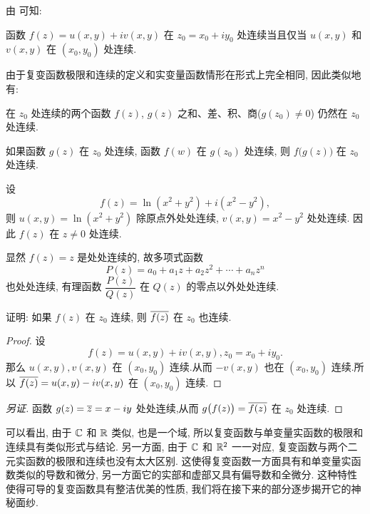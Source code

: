 由 可知:
\begin{theorem}
  函数 $f(z)=u(x,y)+iv(x,y)$ 在 $z_0=x_0+iy_0$ 处连续当且仅当 $u(x,y)$ 和 $v(x,y)$ 在 $(x_0,y_0)$ 处连续.
\end{theorem}

由于复变函数极限和连续的定义和实变量函数情形在形式上完全相同, 因此类似地有:
\begin{theorem}
  \begin{enumpar}
    \item 在 $z_0$ 处连续的两个函数 $f(z)$, $g(z)$ 之和、差、积、商($g(z_0)\neq 0$) 仍然在 $z_0$ 处连续.
    \item 如果函数 $g(z)$ 在 $z_0$ 处连续, 函数 $f(w)$ 在 $g(z_0)$ 处连续, 则 $f\bigl(g(z)\bigr)$ 在 $z_0$ 处连续.
  \end{enumpar}
\end{theorem}

\begin{example}\delspace
  \begin{enumnopar}
    \item 设
    \[f(z)=\ln(x^2+y^2)+i(x^2-y^2),\]
    则 $u(x,y)=\ln(x^2+y^2)$ 除原点外处处连续, $v(x,y)=x^2-y^2$ 处处连续. 因此 $f(z)$ 在 $z\neq0$ 处连续.
    \item 显然 $f(z)=z$ 是处处连续的, 故多项式函数
    \[P(z)=a_0+a_1z+a_2z^2+\cdots+a_nz^n\]
    也处处连续, 有理函数 $\dfrac{P(z)}{Q(z)}$ 在 $Q(z)$ 的零点以外处处连续.
  \end{enumnopar}
\end{example}

\begin{example}
  证明: 如果 $f(z)$ 在 $z_0$ 连续, 则 $\overline{f(z)}$ 在 $z_0$ 也连续.
\end{example}

\begin{proof}
  设
  \[
    f(z)=u(x,y)+iv(x,y),z_0=x_0+iy_0.
  \]
  那么 $u(x,y),v(x,y)$ 在 $(x_0,y_0)$ 连续.从而 $-v(x,y)$ 也在 $(x_0,y_0)$ 连续.所以 $\overline{f(z)}=u(x,y)-iv(x,y)$ 在 $(x_0,y_0)$ 连续.
\end{proof}
\begin{proof}[另证]
  函数 $g(z)=\overline z=x-iy$ 处处连续,从而 $g\bigl(f(z)\bigr)=\overline{f(z)}$ 在 $z_0$ 处连续.
\end{proof}

可以看出, 由于 ${\mathbb{C}}$ 和 ${\mathbb{R}}$ 类似, 也是一个域, 所以复变函数与单变量实函数的极限和连续具有类似形式与结论.
另一方面, 由于 ${\mathbb{C}}$ 和 ${\mathbb{R}}^2$ 一一对应, 复变函数与两个二元实函数的极限和连续也没有太大区别.
这使得复变函数一方面具有和单变量实函数类似的导数和微分, 另一方面它的实部和虚部又具有偏导数和全微分.
这种特性使得可导的复变函数具有整洁优美的性质, 我们将在接下来的部分逐步揭开它的神秘面纱.




